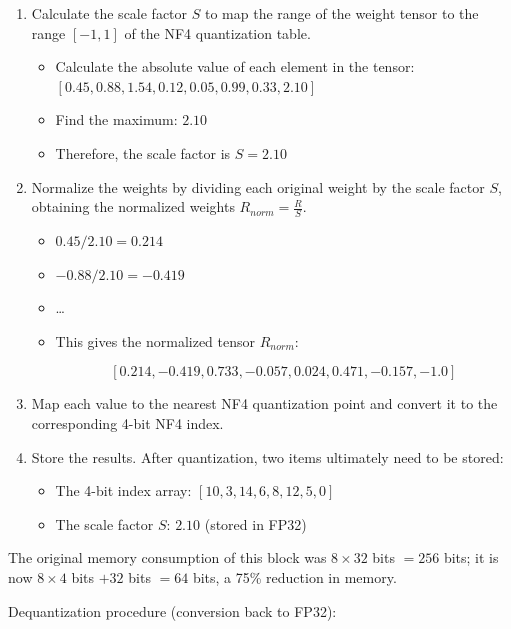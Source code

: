 \begin{enumerate}
\def\labelenumi{\arabic{enumi}.}
\item
  Calculate the scale factor \(S\) to map the range of the weight tensor to the range \([-1, 1]\) of the NF4 quantization table.

  \begin{itemize}
  \tightlist
  \item
    Calculate the absolute value of each element in the tensor: \([0.45, 0.88, 1.54, 0.12, 0.05, 0.99, 0.33, 2.10]\)
  \item
    Find the maximum: \(2.10\)
  \item
    Therefore, the scale factor is \(S = 2.10\)
  \end{itemize}
\item
  Normalize the weights by dividing each original weight by the scale factor \(S\), obtaining the normalized weights \(R_{norm} = \frac{R}{S}\).

  \begin{itemize}
  \tightlist
  \item
    \(0.45 / 2.10 = 0.214\)
  \item
    \(-0.88 / 2.10 = -0.419\)
  \item
    \ldots{}
  \item
    This gives the normalized tensor \(R_{norm}\):

\[
[0.214, -0.419, 0.733, -0.057, 0.024, 0.471, -0.157, -1.0]
\]
  \end{itemize}
\item
  Map each value to the nearest NF4 quantization point and convert it to the corresponding 4-bit NF4 index.
\item
{}
  Store the results. After quantization, two items ultimately need to be stored:

  \begin{itemize}
  \tightlist
  \item
    The 4-bit index array: \([10, 3, 14, 6, 8, 12, 5, 0]\)
  \item
    The scale factor \(S\): \(2.10\) (stored in FP32)
  \end{itemize}
\end{enumerate}

The original memory consumption of this block was \(8 \times 32\) bits \(= 256\) bits; it is now \(8 \times 4\) bits \(+ 32\) bits \(= 64\) bits, a 75\% reduction in memory.

Dequantization procedure (conversion back to FP32):


